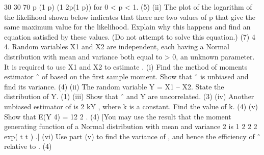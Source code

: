30 30 70 p (1 p) (1 2p(1 p))
for 0 < p < 1.
(5)
(ii) The plot of the logarithm of the likelihood shown below indicates that
there are two values of p that give the same maximum value for the
likelihood. Explain why this happens and find an equation satisfied by
these values. (Do not attempt to solve this equation.)
(7)
4
4. Random variables X1 and X2 are independent, each having a Normal distribution with
mean and variance both equal to > 0, an unknown parameter. It is required to use
X1 and X2 to estimate .
(i) Find the method of moments estimator ˆ of based on the first sample
moment. Show that ˆ is unbiased and find its variance.
(4)
(ii) The random variable Y = X1 – X2. State the distribution of Y.
(1)
(iii) Show that ˆ and Y are uncorrelated.
(3)
(iv) Another unbiased estimator of is 2 kY , where k is a constant. Find the
value of k.
(4)
(v) Show that E(Y
4) = 12
2
.
(4)
[You may use the result that the moment generating function of a Normal
distribution with mean and variance
2 is 1 2 2
2 exp( t t ) .]
(vi) Use part (v) to find the variance of , and hence the efficiency of ˆ relative
to .
(4)
